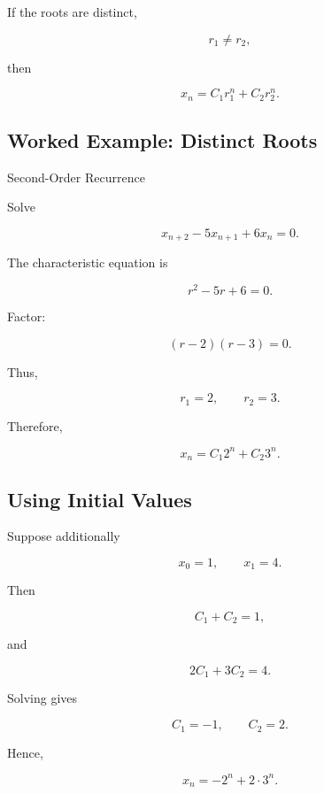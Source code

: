 If the roots are distinct,

\[
r_1\neq r_2,
\]

then

\[
\boxed{
x_n
=
C_1r_1^n
+
C_2r_2^n.
}
\]

\subsection{Worked Example: Distinct Roots}
\label{subsec:worked-difference-distinct-roots}

\begin{workedexamplebox}{Second-Order Recurrence}

Solve

\[
x_{n+2}
-
5x_{n+1}
+
6x_n
=
0.
\]

The characteristic equation is

\[
r^2-5r+6=0.
\]

Factor:

\[
(r-2)(r-3)=0.
\]

Thus,

\[
r_1=2,
\qquad
r_2=3.
\]

Therefore,

\begin{answerbox}
\[
\boxed{
x_n
=
C_1 2^n
+
C_2 3^n.
}
\]
\end{answerbox}

\end{workedexamplebox}

\subsection{Using Initial Values}
\label{subsec:difference-initial-values}

Suppose additionally

\[
x_0=1,
\qquad
x_1=4.
\]

Then

\[
C_1+C_2=1,
\]

and

\[
2C_1+3C_2=4.
\]

Solving gives

\[
C_1=-1,
\qquad
C_2=2.
\]

Hence,

\[
\boxed{
x_n
=
-2^n
+
2\cdot3^n.
}
\]

